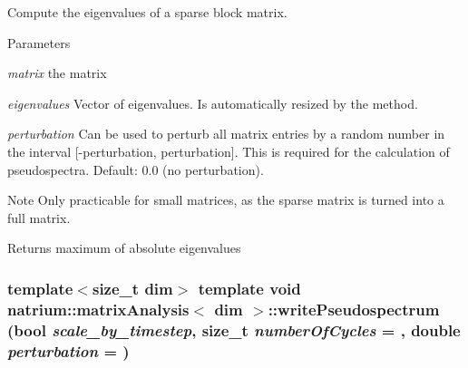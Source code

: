 Compute the eigenvalues of a sparse block matrix. 
\begin{DoxyParams}{Parameters}
\item[{\em matrix}]the matrix \item[{\em eigenvalues}]Vector of eigenvalues. Is automatically resized by the method. \item[{\em perturbation}]Can be used to perturb all matrix entries by a random number in the interval \mbox{[}-\/perturbation, perturbation\mbox{]}. This is required for the calculation of pseudospectra. Default: 0.0 (no perturbation). \end{DoxyParams}
\begin{DoxyNote}{Note}
Only practicable for small matrices, as the sparse matrix is turned into a full matrix. 
\end{DoxyNote}
\begin{DoxyReturn}{Returns}
maximum of absolute eigenvalues 
\end{DoxyReturn}
\hypertarget{classnatrium_1_1matrixAnalysis_a9e9739f9d9181cc8b294bcbeca96df68}{
\subsubsection[{writePseudospectrum}]{\setlength{\rightskip}{0pt plus 5cm}template$<$size\_\-t dim$>$ template void {\bf natrium::matrixAnalysis}$<$ dim $>$::writePseudospectrum (bool {\em scale\_\-by\_\-timestep}, \/  size\_\-t {\em numberOfCycles} = {}, \/  double {\em perturbation} = {})}}
\label{classnatrium_1_1matrixAnalysis_a9e9739f9d9181cc8b294bcbeca96df68}


